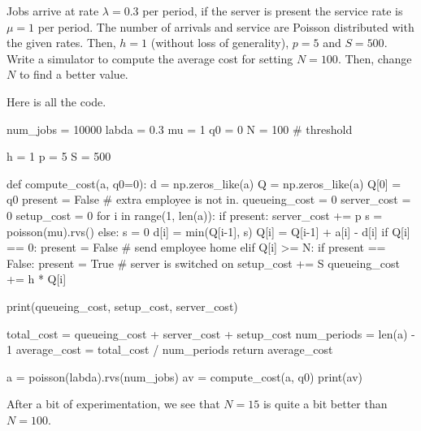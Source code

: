 \begin{exercise}
  Jobs arrive at rate $\lambda=0.3$ per period, if the server is present the service rate is $\mu=1$ per period. The number of arrivals and service are Poisson distributed with the given rates. Then, $h=1$ (without loss of generality), $p=5$ and $S=500$. Write a simulator to compute the average cost for setting $N=100$. Then, change $N$ to find a better value.

\begin{solution}
Here is all the code.  
\begin{pyverbatim}
num_jobs = 10000
labda = 0.3
mu = 1
q0 = 0
N = 100 # threshold

h = 1
p = 5
S = 500


def compute_cost(a, q0=0):
    d = np.zeros_like(a)
    Q = np.zeros_like(a)
    Q[0] = q0
    present = False  # extra employee is not in.
    queueing_cost = 0
    server_cost = 0
    setup_cost = 0
    for i in range(1, len(a)):
        if present:
            server_cost += p
            s = poisson(mu).rvs()
        else:
            s = 0
        d[i] = min(Q[i-1], s)
        Q[i] = Q[i-1] + a[i] - d[i]
        if Q[i] == 0:
            present = False  # send employee home
        elif Q[i] >= N:
            if present == False: 
	            present = True # server is switched on
                setup_cost += S            
        queueing_cost += h * Q[i]

    print(queueing_cost, setup_cost, server_cost)

    total_cost = queueing_cost + server_cost + setup_cost
    num_periods = len(a) - 1
    average_cost = total_cost / num_periods
    return average_cost

a = poisson(labda).rvs(num_jobs)
av = compute_cost(a, q0)
print(av)
\end{pyverbatim}
After a bit of experimentation, we see that $N=15$ is quite a bit better than $N=100$.

\end{solution}


\end{exercise}


